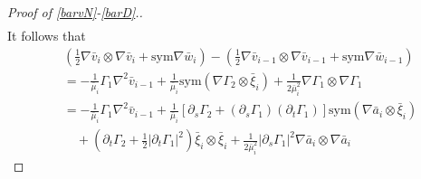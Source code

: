 \documentclass[reqno,12pt]{amsart}
\numberwithin{equation}{section}
\theoremstyle{plain}
\theoremstyle{definition}
\newcommand{\sym}{\text{sym}}
\begin{document}
\begin{proof}[Proof of \eqref{barvN}-\eqref{barD}.]
\begin{align*}
\end{align*}
It follows that
\begin{align*}
    &(\frac{1}{2}\nabla\bar v_i\otimes\nabla\bar v_i+\sym\nabla\bar w_i)-(\frac{1}{2}\nabla\bar v_{i-1}\otimes\nabla\bar v_{i-1}+\sym\nabla\bar w_{i-1})\\
    &=-\frac{1}{ \bar{\mu}_i}\Gamma_1\nabla^2\bar v_{i-1}
    +\frac{1}{ \bar{\mu}_i}\sym(\nabla\Gamma_2\otimes \bar{\xi}_i)
    +\frac{1}{2 \bar{\mu}_i^2}\nabla\Gamma_1\otimes\nabla\Gamma_1\\
    &= -\frac{1}{ \bar{\mu}_i}\Gamma_1\nabla^2\bar v_{i-1}
    +\frac{1}{ \bar{\mu}_i}[\partial_{s}\Gamma_2+(\partial_{s}\Gamma_1)(\partial_{t}\Gamma_1)]\sym(\nabla  \bar{a}_i\otimes \bar{\xi}_i)\\
    &\quad +(\partial_{t}\Gamma_2+\frac{1}{2}|\partial_{t}\Gamma_1|^2) \bar{\xi}_i\otimes \bar{\xi}_i+\frac{1}{2 \bar{\mu}_i^2}|\partial_{s}\Gamma_1|^2\nabla  \bar{a}_i\otimes\nabla  \bar{a}_i
\end{align*}

\end{proof}
\end{document}
